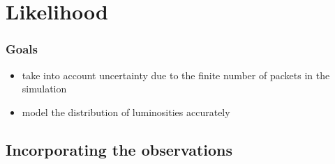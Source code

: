 \documentclass[a4,12pt]{article}
\newcommand{\vecth}{\ensuremath{{\vec{\theta}}}}
\begin{document}

\section{Likelihood}

\subsubsection*{Goals}
\begin{itemize}
\item take into account uncertainty due to the finite number of packets in the simulation
\item model the distribution of luminosities accurately
\end{itemize}

\subsection{Incorporating the observations}
\end{document}
